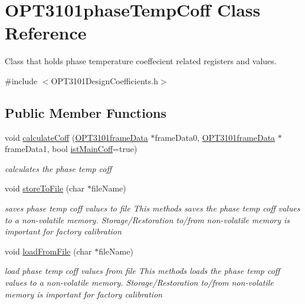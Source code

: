 \hypertarget{class_o_p_t3101phase_temp_coff}{}\section{O\+P\+T3101phase\+Temp\+Coff Class Reference}
\label{class_o_p_t3101phase_temp_coff}


Class that holds phase temperature coeffecient related registers and values.  




{\ttfamily \#include $<$O\+P\+T3101\+Design\+Coefficients.\+h$>$}

\subsection*{Public Member Functions}
\begin{DoxyCompactItemize}
\item 
void \mbox{\hyperlink{class_o_p_t3101phase_temp_coff_adca42cf3c1f2e17dea700a0b94fe78f7}{calculate\+Coff}} (\mbox{\hyperlink{class_o_p_t3101frame_data}{O\+P\+T3101frame\+Data}} $\ast$frame\+Data0, \mbox{\hyperlink{class_o_p_t3101frame_data}{O\+P\+T3101frame\+Data}} $\ast$frame\+Data1, bool \mbox{\hyperlink{class_o_p_t3101phase_temp_coff_a1a23b6ee727c71eb59b07bda0c81476b}{ist\+Main\+Coff}}=true)
\begin{DoxyCompactList}\small\item\em calculates the phase temp coff \end{DoxyCompactList}\item 
void \mbox{\hyperlink{class_o_p_t3101phase_temp_coff_a761f66319ee3381cf1a347414f9dce52}{store\+To\+File}} (char $\ast$file\+Name)
\begin{DoxyCompactList}\small\item\em saves phase temp coff values to file This methods saves the phase temp coff values to a non-\/volatile memory. Storage/\+Restoration to/from non-\/volatile memory is important for factory calibration \end{DoxyCompactList}\item 
void \mbox{\hyperlink{class_o_p_t3101phase_temp_coff_ab4eb67dcca2e8f12b02e849b2d0c4b0d}{load\+From\+File}} (char $\ast$file\+Name)
\begin{DoxyCompactList}\small\item\em load phase temp coff values from file This methods loads the phase temp coff values to a non-\/volatile memory. Storage/\+Restoration to/from non-\/volatile memory is important for factory calibration \end{DoxyCompactList}\end{DoxyCompactItemize}
